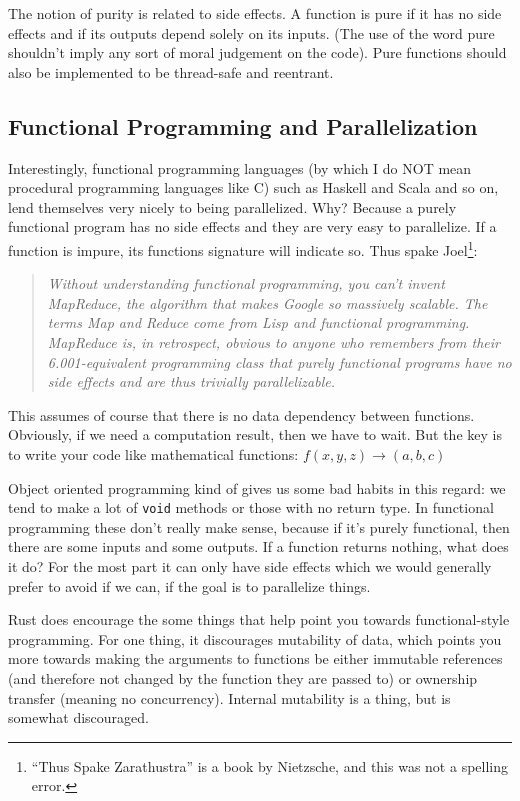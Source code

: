 \documentclass[a4paper]{report}
\begin{document}
The notion of purity is related to side effects. A function is pure if it has no side effects and if its outputs depend solely on its inputs. (The use of the word pure shouldn't imply any sort of moral judgement on the code). Pure functions should also be implemented to be thread-safe and reentrant.


\subsection*{Functional Programming and Parallelization}
Interestingly, functional programming languages (by which I do NOT mean procedural programming languages like C) such as Haskell and Scala and so on, lend themselves very nicely to being parallelized. Why? Because a purely functional program has no side effects and they are very easy to parallelize. If a function is impure, its functions signature will indicate so. Thus spake Joel\footnote{``Thus Spake Zarathustra'' is a book by Nietzsche, and this was not a spelling error.}:

\begin{quote}
\textit{Without understanding functional programming, you can't invent MapReduce, the algorithm that makes Google so massively scalable. The terms Map and Reduce come from Lisp and functional programming. MapReduce is, in retrospect, obvious to anyone who remembers from their 6.001-equivalent programming class that purely functional programs have no side effects and are thus trivially parallelizable.}~\cite{joel:functional}
\end{quote}

This assumes of course that there is no data dependency between functions. Obviously, if we need a computation result, then we have to wait.  But the key is to write your code like mathematical functions: $f(x, y, z) \rightarrow (a, b, c)$

Object oriented programming kind of gives us some bad habits in this regard: we tend to make a lot of \texttt{void} methods or those with no return type. In functional programming these don't really make sense, because if it's purely functional, then there are some inputs and some outputs. If a function returns nothing, what does it do? For the most part it can only have side effects which we would generally prefer to avoid if we can, if the goal is to parallelize things.

Rust does encourage the some things that help point you towards functional-style programming. For one thing, it discourages mutability of data, which points you more towards making the arguments to functions be either immutable references (and therefore not changed by the function they are passed to) or ownership transfer (meaning no concurrency). Internal mutability is a thing, but is somewhat discouraged.
\end{document}
